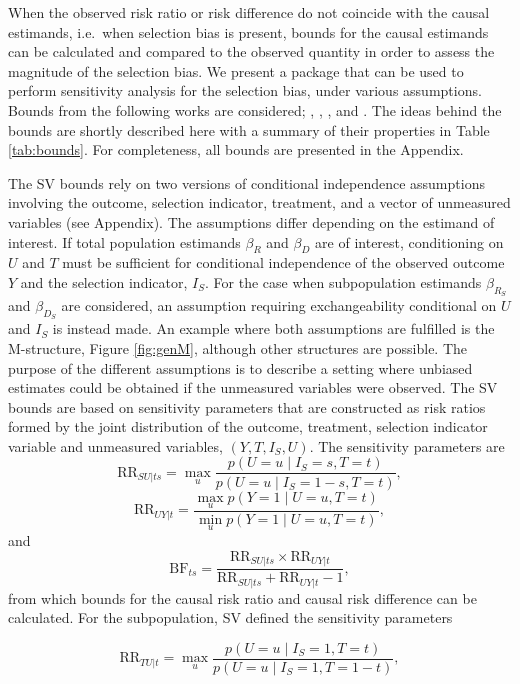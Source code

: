 When the observed risk ratio or risk difference do not coincide with the causal
estimands, i.e.~when selection bias is present, bounds for the causal estimands
can be calculated and compared to the observed quantity in order to assess the
magnitude of the selection bias. We present a package that can be used to
perform sensitivity analysis for the selection bias, under various assumptions.
Bounds from the following works are considered; \citet{smith2019bounding},
\citet{zetterstrom2022selection}, \citet{zetterstrom2024}, and \citet{zetterstrom2025investigations}.
The ideas behind the bounds are shortly described here with a summary of their
properties in Table \ref{tab:bounds}. For completeness, all bounds are
presented in the Appendix.

The SV bounds rely on two versions of conditional independence assumptions
involving the outcome, selection indicator, treatment, and a vector of
unmeasured variables (see Appendix). The assumptions differ depending on the
estimand of interest. If total population estimands \(\beta_{R}\) and \(\beta_{D}\)
are of interest, conditioning on \(U\) and \(T\) must be sufficient for conditional
independence of the observed outcome \(Y\) and the selection indicator, \(I_S\). For
the case when subpopulation estimands \(\beta_{R_S}\) and \(\beta_{D_S}\) are
considered, an assumption requiring exchangeability conditional on \(U\) and \(I_S\)
is instead made. An example where both assumptions are fulfilled is the
M-structure, Figure \ref{fig:genM}, although other structures are possible.
The purpose of the different assumptions is to describe a setting where unbiased
estimates could be obtained if the unmeasured variables were observed. The SV
bounds are based on sensitivity parameters that are constructed as risk ratios
formed by the joint distribution of the outcome, treatment, selection indicator
variable and unmeasured variables, \((Y,T,I_S,U)\). The sensitivity parameters are
\[
\mathrm{RR}_{SU|ts} = \max_u \frac{p(U=u \mid I_S=s, T=t)}{p(U=u \mid I_S=1-s, T=t)},
\]
\[
\mathrm{RR}_{UY|t} = \frac{\max_u p(Y=1 \mid U=u, T=t)}{\min_u p(Y=1 \mid U=u, T=t)},
\]
and
\[
\mathrm{BF}_{ts} = \frac{\mathrm{RR}_{SU|ts} \times \mathrm{RR}_{UY|t}}{\mathrm{RR}_{SU|ts} + \mathrm{RR}_{UY|t} - 1},
\]
from which bounds for the causal risk ratio and causal risk difference can be
calculated. For the subpopulation, SV defined the sensitivity parameters

\[
\mathrm{RR}_{TU|t} = \max_u \frac{p(U=u \mid I_S=1, T=t)}{p(U=u \mid I_S=1, T=1-t)},
\]

